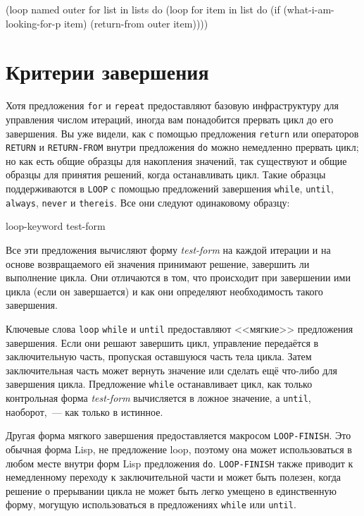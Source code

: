 \begin{myverb}
(loop named outer for list in lists do
     (loop for item in list do
          (if (what-i-am-looking-for-p item)
            (return-from outer item))))
\end{myverb}

\section{Критерии завершения}

Хотя предложения \lstinline{for} и \lstinline{repeat} предоставляют базовую инфраструктуру для
управления числом итераций, иногда вам понадобится прервать цикл до его завершения. Вы уже
видели, как с помощью предложения \lstinline{return} или операторов \lstinline{RETURN} и
\lstinline{RETURN-FROM} внутри предложения \lstinline{do} можно немедленно прервать цикл; но как
есть общие образцы для накопления значений, так существуют и общие образцы для принятия
решений, когда останавливать цикл. Такие образцы поддерживаются в \lstinline{LOOP} с помощью
предложений завершения \lstinline{while}, \lstinline{until}, \lstinline{always}, \lstinline{never} и
\lstinline{thereis}. Все они следуют одинаковому образцу:

\begin{myverb}
loop-keyword test-form
\end{myverb}

Все эти предложения вычисляют форму \textit{test-form} на каждой итерации и на основе
возвращаемого ей значения принимают решение, завершить ли выполнение цикла. Они отличаются
в том, что происходит при завершении ими цикла (если он завершается) и как они определяют
необходимость такого завершения.

Ключевые слова \lstinline{loop} \lstinline{while} и \lstinline{until} предоставляют <<мягкие>> предложения
завершения. Если они решают завершить цикл, управление передаётся в заключительную часть,
пропуская оставшуюся часть тела цикла. Затем заключительная часть может вернуть значение
или сделать ещё что-либо для завершения цикла. Предложение \lstinline{while} останавливает цикл,
как только контрольная форма \textit{test-form} вычисляется в ложное значение, а
\lstinline{until}, наоборот,~--- как только в истинное.

Другая форма мягкого завершения предоставляется макросом \lstinline{LOOP-FINISH}. Это обычная
форма Lisp, не предложение loop, поэтому она может использоваться в любом месте внутри
форм Lisp предложения \lstinline{do}. \lstinline{LOOP-FINISH} также приводит к немедленному
переходу к заключительной части и может быть полезен, когда решение о прерывании цикла не
может быть легко умещено в единственную форму, могущую использоваться в предложениях
\lstinline{while} или \lstinline{until}.

